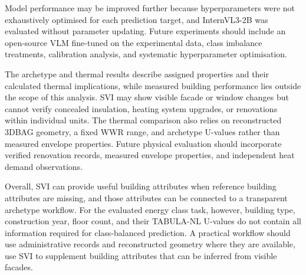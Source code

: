 Model performance may be improved further because hyperparameters were not exhaustively optimised for each prediction target, and InternVL3-2B was evaluated without parameter updating. Future experiments should include an open-source \ac{VLM} fine-tuned on the experimental data, class imbalance treatments, calibration analysis, and systematic hyperparameter optimisation.

The archetype and thermal results describe assigned properties and their calculated thermal implications, while measured building performance lies outside the scope of this analysis. \Ac{SVI} may show visible facade or window changes but cannot verify concealed insulation, heating system upgrades, or renovations within individual units. The thermal comparison also relies on reconstructed 3DBAG geometry, a fixed WWR range, and archetype U-values rather than measured envelope properties. Future physical evaluation should incorporate verified renovation records, measured envelope properties, and independent heat demand observations. 

Overall, \Ac{SVI} can provide useful building attributes when reference building attributes are missing, and those attributes can be connected to a transparent archetype workflow. For the evaluated energy class task, however, building type, construction year, floor count, and their TABULA-NL U-values do not contain all information required for class-balanced prediction. A practical workflow should use administrative records and reconstructed geometry where they are available, use \ac{SVI} to supplement building attributes that can be inferred from visible facades.
